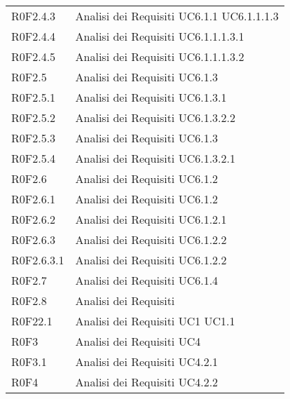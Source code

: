 \documentclass[../AnalisiDeiRequisiti.tex]{subfiles}
\begin{document}
\begin{longtable}{p{5cm}!{\VRule[1pt]}p{5cm}}
		\\
		R0F2.4.3 & Analisi dei Requisiti \newline UC6.1.1
		\newline UC6.1.1.1.3
		\\
		R0F2.4.4 & Analisi dei Requisiti \newline UC6.1.1.1.3.1
		\\
		R0F2.4.5 & Analisi dei Requisiti \newline UC6.1.1.1.3.2
		\\
		R0F2.5 & Analisi dei Requisiti \newline UC6.1.3
		\\
		R0F2.5.1 & Analisi dei Requisiti \newline UC6.1.3.1
		\\
		R0F2.5.2 & Analisi dei Requisiti \newline UC6.1.3.2.2
		\\
		R0F2.5.3 & Analisi dei Requisiti \newline UC6.1.3
		\\
		R0F2.5.4 & Analisi dei Requisiti \newline UC6.1.3.2.1
		\\
		R0F2.6 & Analisi dei Requisiti \newline UC6.1.2
		\\
		R0F2.6.1 & Analisi dei Requisiti \newline UC6.1.2
		\\
		R0F2.6.2 & Analisi dei Requisiti \newline UC6.1.2.1
		\\
		R0F2.6.3 & Analisi dei Requisiti \newline UC6.1.2.2
		\\
		R0F2.6.3.1 & Analisi dei Requisiti \newline UC6.1.2.2
		\\
		R0F2.7 & Analisi dei Requisiti \newline UC6.1.4
		\\
		R0F2.8 & Analisi dei Requisiti \\
		R0F22.1 & Analisi dei Requisiti \newline UC1
		\newline UC1.1
		\\
		R0F3 & Analisi dei Requisiti \newline UC4
		\\
		R0F3.1 & Analisi dei Requisiti \newline UC4.2.1
		\\
		R0F4 & Analisi dei Requisiti \newline UC4.2.2

\end{longtable}
\end{document}

